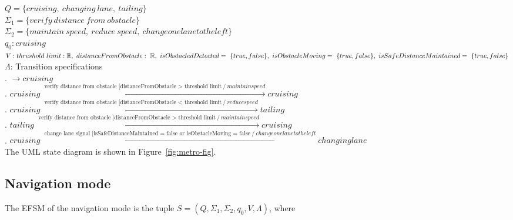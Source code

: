 \documentclass[12pt]{article}
\begin{document}
\begin{spacing}{1.5}
\noindent $Q = \{cruising,~changing~lane,~tailing\}$\\
\noindent $\Sigma_1 = \{verify~distance~from~obstacle\}$\\
\noindent $\Sigma_2 = \{maintain~speed,~reduce~speed,~change one lane to the left\}$\\
\noindent $q_0: cruising$\\
\noindent $V: threshold~limit: \mathbb R,~distanceFromObstacle:~ \mathbb R,~isObstacledDetected=~\{true, false\},\newline~isObstacleMoving=~\{true,false\},~isSafeDistanceMaintained=~\{true,false\}$\\
\noindent $\Lambda$: Transition specifications\\
. $\rightarrow cruising$\\
. $cruising \xrightarrow {\text { verify distance from obstacle [distanceFromObstacle > threshold limit}~/ ~maintain speed} cruising$\\
. $cruising \xrightarrow {\text { verify distance from obstacle [distanceFromObstacle < threshold limit}~/ ~reduce speed} tailing$\\
. $tailing \xrightarrow {\text { verify distance from obstacle [distanceFromObstacle > threshold limit}~/ ~maintain speed} cruising$\\
. $cruising \xrightarrow {\text { change lane signal [isSafeDistanceMaintained = false or isObstacleMoving = false}~/ ~change one lane to the left} changing lane$\\


\noindent The UML state diagram is shown in Figure~\ref{fig:metro-fig}.

\newpage

\subsection{Navigation mode}

\noindent The EFSM of the navigation mode is the tuple $S = (Q, \Sigma_1, \Sigma_2, q_0, V, \Lambda)$, where\\


\end{spacing}
\end{document}
